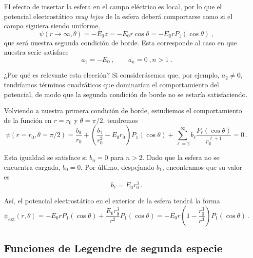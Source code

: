 \begin{ejemplo}
    El efecto de insertar la esfera en el campo eléctrico es local, por lo que el potencial electrostático \emph{muy lejos} de la esfera deberá comportarse como si el campo siguiera siendo uniforme,
    \begin{equation*}
        \psi(r \to \infty, \theta) = - E_0 z = -E_0 r \cos \theta = - E_0 r P_1(\cos \theta) \ ,
    \end{equation*}
    que será nuestra segunda condición de borde. Esta corresponde al caso en que nuestra serie satisface
    \begin{equation*}
        a_1 = -E_0 \ , \qquad a_n = 0 \ , n > 1 \ .
    \end{equation*}

    ¿Por qué es relevante esta elección? Si considerásemos que, por ejemplo, $a_2 \neq 0$, tendríamos términos cuadráticos que dominarían el comportamiento del potencial, de modo que la segunda condición de borde no se estaría satisfaciendo.

    Volviendo a nuestra primera condición de borde, estudiemos el comportamiento de la función en $r = r_0$ y $\theta = \pi/2$. tendremos
    \begin{equation*}
        \psi(r = r_0, \theta = \pi/2) = \frac{b_0}{r_0} + \left( \frac{b_1}{r_0^2} - E_0 r_0 \right) P_1 (\cos \theta) + \sum_{\ell=2}^\infty b_\ell \frac{P_\ell (\cos \theta)}{r_0^{\ell+1}} = 0 \ .
    \end{equation*}

    Esta igualdad se satisface si $b_n = 0$ para $n > 2$. Dado que la esfera no se encuentra cargada, $b_0 = 0$. Por último, despejando $b_1$, encontramos que su valor es
    \begin{equation*}
        b_1 = E_0 r_0^3 \ .
    \end{equation*}

    Así, el potencial electrostático en el exterior de la esfera tendrá la forma
    \begin{equation*}
        \psi_{\text{ext}}(r, \theta) = -E_0 r P_1(\cos \theta) + \frac{E_0 r_0^3}{r^2} P_1(\cos\theta) = - E_0 r \left(1 - \frac{r_0^3}{r^3} \right) P_1 (\cos \theta) \ .
    \end{equation*}

\end{ejemplo}

\subsection{Funciones de Legendre de segunda especie}

